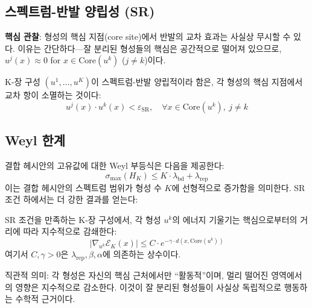 \subsection{스펙트럼-반발 양립성 (SR)}

\textbf{핵심 관찰}: 형성의 핵심 지점(core site)에서 반발의 교차 효과는 사실상 무시할 수 있다. 이유는 간단하다---잘 분리된 형성들의 핵심은 공간적으로 떨어져 있으므로, $u^j(x) \approx 0$ for $x \in \mathrm{Core}(u^k)$ ($j \neq k$)이다.

\begin{definition}
\label{def:spectral-repulsion}
K-장 구성 $(u^1, \ldots, u^K)$이 스펙트럼-반발 양립적이라 함은, 각 형성의 핵심 지점에서 교차 항이 소멸하는 것이다:
\begin{equation}
    u^j(x) \cdot u^k(x) < \varepsilon_{\mathrm{SR}}, \quad \forall x \in \mathrm{Core}(u^k),\ j \neq k
    \label{eq:sr-condition}
\end{equation}
\end{definition}

\subsection{Weyl 한계}

결합 헤시안의 고유값에 대한 Weyl 부등식은 다음을 제공한다:
\begin{equation}
    \sigma_{\max}(H_K) \leq K \cdot \lambda_{\mathrm{bd}} + \lambda_{\mathrm{rep}}
    \label{eq:weyl-bound}
\end{equation}
이는 결합 헤시안의 스펙트럼 범위가 형성 수 $K$에 선형적으로 증가함을 의미한다. SR 조건 하에서는 더 강한 결과를 얻는다:

\begin{theorem}[결합 한계 보조정리]
\label{thm:coupling-bound}
SR 조건을 만족하는 K-장 구성에서, 각 형성 $u^k$의 에너지 기울기는 핵심으로부터의 거리에 따라 지수적으로 감쇄한다:
\begin{equation}
    |\nabla_{u^k} \mathcal{E}_K(x)| \leq C \cdot e^{-\gamma \cdot d(x, \mathrm{Core}(u^k))}
    \label{eq:gradient-decay}
\end{equation}
여기서 $C, \gamma > 0$은 $\lambda_{\mathrm{rep}}, \beta, \alpha$에 의존하는 상수이다.
\end{theorem}

직관적 의미: 각 형성은 자신의 핵심 근처에서만 ``활동적''이며, 멀리 떨어진 영역에서의 영향은 지수적으로 감소한다. 이것이 잘 분리된 형성들이 사실상 독립적으로 행동하는 수학적 근거이다.

